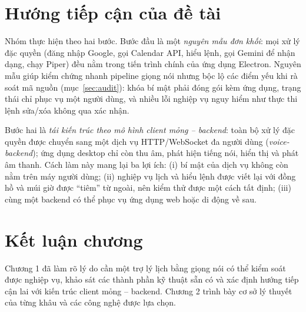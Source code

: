 \section{Hướng tiếp cận của đề tài}
Nhóm thực hiện theo hai bước. Bước đầu là một \textit{nguyên mẫu đơn khối}: mọi xử lý đặc quyền (đăng nhập Google, gọi Calendar API, hiểu lệnh, gọi Gemini để nhận dạng, chạy Piper) đều nằm trong tiến trình chính của ứng dụng Electron. Nguyên mẫu giúp kiểm chứng nhanh pipeline giọng nói nhưng bộc lộ các điểm yếu khi rà soát mã nguồn (mục~\ref{sec:audit}): khóa bí mật phải đóng gói kèm ứng dụng, trạng thái chỉ phục vụ một người dùng, và nhiều lỗi nghiệp vụ nguy hiểm như thực thi lệnh sửa/xóa không qua xác nhận.

Bước hai là \textit{tái kiến trúc theo mô hình client mỏng – backend}: toàn bộ xử lý đặc quyền được chuyển sang một dịch vụ HTTP/WebSocket đa người dùng (\textit{voice-backend}); ứng dụng desktop chỉ còn thu âm, phát hiện tiếng nói, hiển thị và phát âm thanh. Cách làm này mang lại ba lợi ích: (i) bí mật của dịch vụ không còn nằm trên máy người dùng; (ii) nghiệp vụ lịch và hiểu lệnh được viết lại với đồng hồ và múi giờ được “tiêm” từ ngoài, nên kiểm thử được một cách tất định; (iii) cùng một backend có thể phục vụ ứng dụng web hoặc di động về sau.

\section{Kết luận chương}
Chương 1 đã làm rõ lý do cần một trợ lý lịch bằng giọng nói có thể kiểm soát được nghiệp vụ, khảo sát các thành phần kỹ thuật sẵn có và xác định hướng tiếp cận lai với kiến trúc client mỏng – backend. Chương 2 trình bày cơ sở lý thuyết của từng khâu và các công nghệ được lựa chọn.
